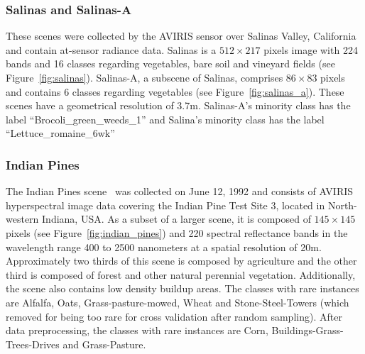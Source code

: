 \documentclass[information,article,submit,moreauthors,pdftex]{Definitions/mdpi}
\begin{document}
\begin{paracol}{2}
\subsubsection*{Salinas and Salinas-A}

These scenes were collected by the AVIRIS sensor over Salinas Valley,
California and contain at-sensor radiance data. Salinas is a $512 \times 217$
pixels image with 224 bands and 16 classes regarding vegetables, bare soil and
vineyard fields (see Figure~\ref{fig:salinas}). Salinas-A, a subscene of
Salinas, comprises $86 \times 83$ pixels and contains 6 classes regarding
vegetables (see Figure~\ref{fig:salinas_a}). These scenes have a geometrical
resolution of 3.7m. Salinas-A's minority class has the label
``Brocoli\_green\_weeds\_1'' and Salina's minority class has the label
``Lettuce\_romaine\_6wk''

\subsubsection*{Indian Pines} 

The Indian Pines scene~\citep{Baumgardner2015} was collected on June 12, 1992
and consists of AVIRIS hyperspectral image data covering the Indian Pine Test
Site 3, located in North-western Indiana, USA. As a subset of a larger scene,
it is composed of $145 \times 145$ pixels (see Figure~\ref{fig:indian_pines})
and 220 spectral reflectance bands in the wavelength range 400 to 2500
nanometers at a spatial resolution of 20m. Approximately two thirds of
this scene is composed by agriculture and the other third is composed of
forest and other natural perennial vegetation. Additionally, the scene also
contains low density buildup areas. The classes with rare instances are
Alfalfa, Oats, Grass-pasture-mowed, Wheat and Stone-Steel-Towers (which
removed for being too rare for cross validation after random sampling).  After
data preprocessing, the classes with rare instances are Corn,
Buildings-Grass-Trees-Drives and Grass-Pasture.

\pagebreak
\end{paracol}
\end{document}
